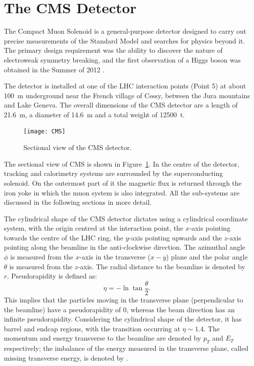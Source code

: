 
\section{The CMS Detector}
\label{s:CMS}

The Compact Muon Solenoid \autocite{CMS} is a general-purpose detector designed to carry out precise measurements of the
Standard Model and searches for physics beyond it. The primary design requirement was the ability to discover the nature
of electroweak symmetry breaking, and the first observation of a Higgs boson was obtained in the Summer of 2012
\autocite{CMS_higgs_observation}.

The detector is installed at one of the LHC interaction points (Point 5) at about \SI{100}{\metre} underground near the
French village of Cessy, between the Jura mountains and Lake Geneva. The overall dimensions of the CMS detector are a
length of \SI{21.6}{\metre}, a diameter of \SI{14.6}{\metre} and a total weight of \SI{12500}{\tonne}.

\begin{figure}[htbp]
  \centering
  \leavevmode
  \texttt{[image: CMS]}
  \caption{Sectional view of the CMS detector.}
  \label{fig:CMS}
\end{figure}

The sectional view of CMS is shown in Figure~\ref{fig:CMS}. In the centre of the detector, tracking and calorimetry
systems are surrounded by the superconducting solenoid. On the outermost part of it the magnetic flux is returned
through the iron yoke in which the muon system is also integrated. All the sub-systems are discussed in the following
sections in more detail.

The cylindrical shape of the CMS detector dictates using a cylindrical coordinate system, with the origin centred at the
interaction point, the $x$-axis pointing towards the centre of the LHC ring, the $y$-axis pointing upwards and the
$z$-axis pointing along the beamline in the anti-clockwise direction. The azimuthal angle $\phi$ is measured from the
$x$-axis in the transverse ($x-y$) plane and the polar angle $\theta$ is measured from the $z$-axis. The radial distance
to the beamline is denoted by $r$. Pseudorapidity is defined as:
\begin{equation}
  \eta = - \ln{\tan{\frac{\theta}{2}}}.
\end{equation}
This implies that the particles moving in the transverse plane (perpendicular to the beamline) have a pseudorapidity of
0, whereas the beam direction has an infinite pseudorapidity. Considering the cylindrical shape of the detector, it has
barrel and endcap regions, with the transition occurring at $\eta \sim 1.4$. The momentum and energy transverse to the
beamline are denoted by $p_T$ and $E_T$ respectively; the imbalance of the energy measured in the transverse plane,
called missing transverse energy, is denoted by \ETm.

